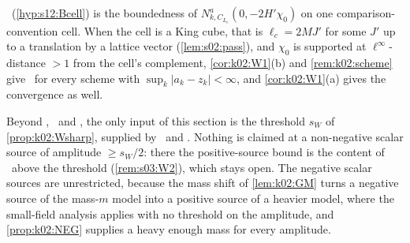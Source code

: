 \begin{remark}\label{rem:k02:cell}
\Bcell\ (\cref{hyp:s12:Bcell}) is the boundedness of $N^a_{k,C_{L_c}}(0,-2H'\chi_0)$ on one comparison-convention cell. When the cell is a King cube, that is $\ell_c=2MJ'$ for some $J'$ up to a translation by a lattice vector (\cref{lem:s02:pass}), and $\chi_0$ is supported at $\ell^\infty$-distance $>1$ from the cell's complement, \cref{cor:k02:W1}(b) and \cref{rem:k02:scheme} give \Bcell\ for every scheme with $\sup_k|a_k-z_k|<\infty$, and \cref{cor:k02:W1}(a) gives the convergence as well.
\end{remark}

\begin{remark}\label{rem:k02:scope}
Beyond \BALint, \RENorb\ and \Kh, the only input of this section is the threshold $s_W$ of \cref{prop:k02:Wsharp}, supplied by \Itwo\ and \Ithree. Nothing is claimed at a non-negative scalar source of amplitude $\ge s_W/2$: there the positive-source bound is the content of \Wtwo\ above the threshold (\cref{rem:s03:W2}), which stays open. The negative scalar sources are unrestricted, because the mass shift of \cref{lem:k02:GM} turns a negative source of the mass-$m$ model into a positive source of a heavier model, where the small-field analysis applies with no threshold on the amplitude, and \cref{prop:k02:NEG} supplies a heavy enough mass for every amplitude.
\end{remark}
